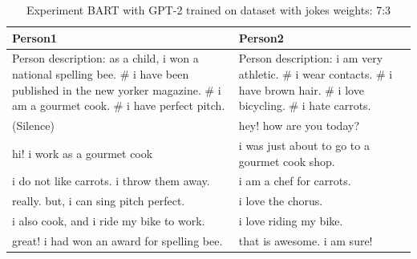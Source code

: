 \begin{table}[ht]
\centering
 \begin{tabular}{|p{7cm}|p{7cm}|} 
 \hline\hline
 \textbf{Person1} & \textbf{Person2} \\
 \hline\hline
 Person description: as a child, i won a national spelling bee. \# i have been published in the new yorker magazine. \# i am a gourmet cook. \# i have perfect pitch. & Person description: i am very athletic. \# i wear contacts. \# i have brown hair. \# i love bicycling. \# i hate carrots. \\
 \hline
 (Silence) & hey! how are you today? \\ 
 \hline
 hi! i work as a gourmet cook & i was just about to go to a gourmet cook shop. \\
 \hline
 i do not like carrots. i throw them away. & i am a chef for carrots.\\
 \hline 
 really. but, i can sing pitch perfect. & i love the chorus. \\
 \hline
 i also cook, and i ride my bike to work. & i love riding my bike. \\
 \hline 
 great! i had won an award for spelling bee. & that is awesome. i am sure! \\
 \hline\hline
 \end{tabular}
 \caption{Experiment BART with GPT-2 trained on dataset with jokes weights: 7:3}
\label{tab:bart_conversation_gpt2}
\end{table}

